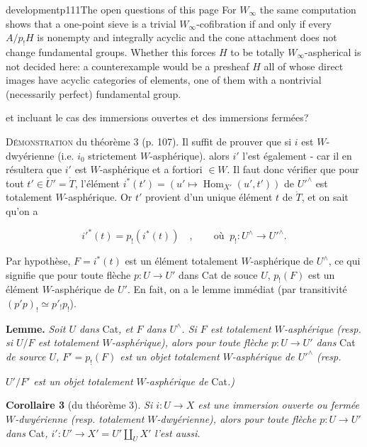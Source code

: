 \begin{enumerate}[label=\alph*)]
\begin{dcomment}{development}{p111}{The open questions of this page}
For $W_\infty$ the same computation shows that a one-point sieve is a trivial $W_\infty$-cofibration if and only if every $A/p_!H$ is nonempty and integrally acyclic and the cone attachment does not change fundamental groups. Whether this forces $H$ to be totally $W_\infty$-aspherical is not decided here: a counterexample would be a presheaf $H$ all of whose direct images have acyclic categories of elements, one of them with a nontrivial (necessarily perfect) fundamental group.
\end{dcomment}


et incluant le cas des immersions ouvertes et des immersions fermées?
\end{enumerate}

\textsc{Démonstration} du théorème 3 (p. 107). Il suffit de prouver que si $i$ est $W$-dwyérienne (i.e. $i_0$ strictement $W$-asphérique). alors $i'$ l'est également - car il en résultera que $i'$ est $W$-asphérique et a fortiori $\in W$. Il faut donc vérifier que pour tout $t'\in\dot{U}'=\dot{T}$, l'élément $i^*(t')=(u'\longmapsto\operatorname{Hom}_{X'}(u',t'))$ de $U'^\wedge$ est totalement $W$-asphérique. Or $t'$ provient d'un unique élément $t$ de $\dot{T}$, et on sait qu'on a %

\[ i'^*(t)=p_!(i^*(t))\quad,\qquad\text{où }\ p_!:U^\wedge\longrightarrow U'^\wedge. \]

Par hypothèse, $F=i^*(t)$ est un élément totalement $W$-asphérique de $U^\wedge$, ce qui signifie que pour toute flèche $p:U\longrightarrow U'$ dans Cat de souce $U$, $p_!(F)$ est un élément $W$-asphérique de $U'$. En fait, on a le lemme immédiat (par transitivité $(p'p)_!\simeq p'_!p_!$). %

\textbf{Lemme.} \textit{Soit $U$ dans} Cat\textit{, et $F$ dans $U^\wedge$. Si $F$ est totalement $W$-asphérique (resp. si $U/F$ est totalement $W$-asphérique), alors pour toute flèche $p:U\longrightarrow U'$ dans} Cat \textit{de source $U$, $F'=p_!(F)$ est un objet totalement $W$-asphérique de $U'^\wedge$ (resp.}


\textit{$U'/F'$ est un objet totalement $W$-asphérique de} Cat\textit{.)}

\textbf{Corollaire 3} (du théorème 3). \textit{Si $i:U\longrightarrow X$ est une immersion ouverte ou fermée $W$-dwyérienne (resp. totalement $W$-dwyérienne), alors pour toute flèche $p:U\longrightarrow U'$ dans} Cat\textit{, $i':U'\longrightarrow X'=U'\amalg_U X'$} \textit{l'est aussi.}

